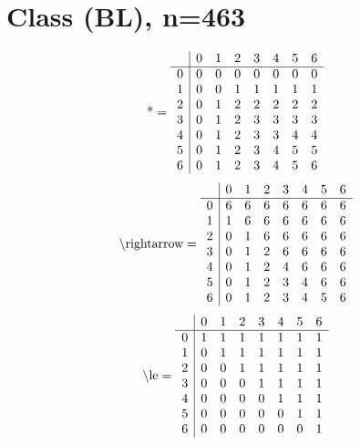 \documentclass[11pt]{article}
\begin{document}
\section{Class (BL), n=463}
\[\text{*} = 
\begin{array}{r | r r r r r r r}
 & 0 & 1 & 2 & 3 & 4 & 5 & 6 \\ \hline
0 & 0 & 0 & 0 & 0 & 0 & 0 & 0 \\
1 & 0 & 0 & 1 & 1 & 1 & 1 & 1 \\
2 & 0 & 1 & 2 & 2 & 2 & 2 & 2 \\
3 & 0 & 1 & 2 & 3 & 3 & 3 & 3 \\
4 & 0 & 1 & 2 & 3 & 3 & 4 & 4 \\
5 & 0 & 1 & 2 & 3 & 4 & 5 & 5 \\
6 & 0 & 1 & 2 & 3 & 4 & 5 & 6 \\
\end{array}
\]
\[\text{\textbackslash rightarrow} = 
\begin{array}{r | r r r r r r r}
 & 0 & 1 & 2 & 3 & 4 & 5 & 6 \\ \hline
0 & 6 & 6 & 6 & 6 & 6 & 6 & 6 \\
1 & 1 & 6 & 6 & 6 & 6 & 6 & 6 \\
2 & 0 & 1 & 6 & 6 & 6 & 6 & 6 \\
3 & 0 & 1 & 2 & 6 & 6 & 6 & 6 \\
4 & 0 & 1 & 2 & 4 & 6 & 6 & 6 \\
5 & 0 & 1 & 2 & 3 & 4 & 6 & 6 \\
6 & 0 & 1 & 2 & 3 & 4 & 5 & 6 \\
\end{array}
\]
\[\text{\textbackslash le} = 
\begin{array}{r | r r r r r r r}
 & 0 & 1 & 2 & 3 & 4 & 5 & 6 \\ \hline
0 & 1 & 1 & 1 & 1 & 1 & 1 & 1 \\
1 & 0 & 1 & 1 & 1 & 1 & 1 & 1 \\
2 & 0 & 0 & 1 & 1 & 1 & 1 & 1 \\
3 & 0 & 0 & 0 & 1 & 1 & 1 & 1 \\
4 & 0 & 0 & 0 & 0 & 1 & 1 & 1 \\
5 & 0 & 0 & 0 & 0 & 0 & 1 & 1 \\
6 & 0 & 0 & 0 & 0 & 0 & 0 & 1 \\
\end{array}
\]
\end{document}
